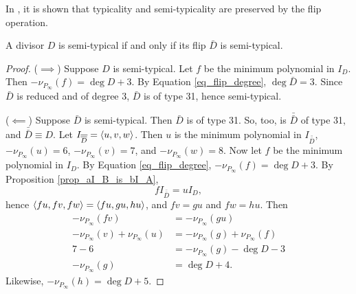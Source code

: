 In \cite{kmakdisi18}, it is shown that typicality and semi-typicality are preserved by the flip operation.
\begin{theorem}
  A divisor $D$ is semi-typical if and only if its flip $\bar D$ is semi-typical.
\end{theorem}
\begin{proof}
  ($\implies$)
  Suppose $D$ is semi-typical.
  Let $f$ be the minimum polynomial in $I_D$.
  Then $-\nu_{P_\infty}(f) = \deg D + 3$.
  By Equation \ref{eq_flip_degree}, $\deg \bar D = 3$.
  Since $\bar D$ is reduced and of degree 3, $\bar D$ is of type 31, hence semi-typical.
  
  ($\impliedby$)
  Suppose $\bar D$ is semi-typical.
  Then $\bar D$ is of type 31.
  So, too, is $\bar{\bar D}$ of type 31, and $\bar{\bar D} \equiv D$.
  Let $I_{\overline {\overline D}} = \left\langle u,v,w \right\rangle$.
  Then $u$ is the minimum polynomial in $I_{\bar{\bar D}}$,
  $-\nu_{P_\infty}(u) = 6$, $-\nu_{P_\infty}(v) = 7$, and $-\nu_{P_\infty}(w) = 8$.
  Now let $f$ be the minimum polynomial in $I_D$.
  By Equation \ref{eq_flip_degree}, $-\nu_{P_\infty}(f) = \deg D + 3$.
  By Proposition \ref{prop_aI_B_is_bI_A},
  \[ fI_{\bar{\bar D}} = uI_D, \]
  hence $\left\langle fu, fv, fw \right\rangle = \left\langle fu, gu, hu \right\rangle$, and $fv = gu$ and $fw = hu$.
  Then
  \begin{align*}
    -\nu_{P_\infty}(fv) &= -\nu_{P_\infty}(gu) \\
    -\nu_{P_\infty}(v) + \nu_{P_\infty}(u) &= -\nu_{P_\infty}(g) + \nu_{P_\infty}(f) \\
    7 - 6 &= -\nu_{P_\infty}(g) - \deg D - 3\\
    -\nu_{P_\infty}(g) &=  \deg D + 4.
  \end{align*}
  Likewise, $-\nu_{P_\infty}(h) =  \deg D + 5$.
\end{proof}

